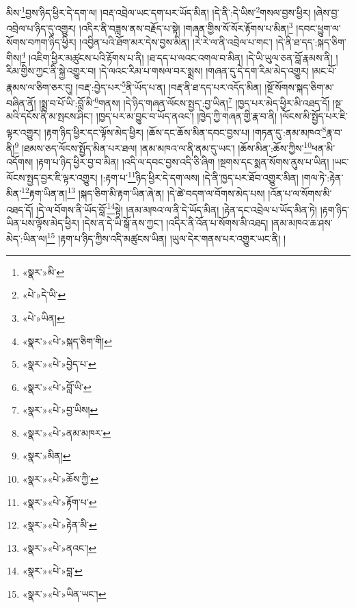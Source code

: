 མིས་\footnote{«སྣར་»མི་}བྱས་ཉིད་ཕྱིར་དེ་དག་ལ། །བརྡ་འབྲེལ་ཡང་དག་པར་ཡོད་མིན། །དེ་ནི་:དེ་ཡིས་\footnote{«པེ་»དེ་ཡི་}གསལ་བྱས་ཕྱིར། །ཞེས་བྱ་འབྲེལ་པ་ཉིད་དུ་འགྱུར། །འདིར་ནི་བཟླས་ནས་བརྗོད་པ་སྟེ། །གཞན་གྱིས་སོ་སོར་རྟོགས་པ་མིན།\footnote{«པེ་»ཡིན།} །དབང་ཕྱུག་ལ་སོགས་བཀག་ཉིད་ཕྱིར། །འབྱིན་པའི་ཐོག་མར་དེས་བྱས་མིན། །རེ་རེ་ལ་ནི་འབྲེལ་པ་གང་། །དེ་ནི་ཐ་དད་:སྐད་ཅིག་གིས།\footnote{«སྣར་»«པེ་»སྐད་ཅིག་གི།} །འཇིག་ཕྱིར་མཚུངས་པའི་རྟོགས་པ་ནི། །ཐ་དད་པ་ལའང་འགལ་བ་མིན། །དེ་ཡི་ཡུལ་ཅན་བློ་རྣམས་ནི། །རིམ་གྱིས་ཀྱང་ནི་སྐྱེ་འགྱུར་བ། །དེ་ལའང་རིམ་པ་གསལ་བར་སྨྲས། །གཞན་དུ་དེ་དག་རིམ་མེད་འགྱུར། །མང་པོ་རྣམས་ལ་ཅིག་ཅར་དུ། །བརྡ་:བྱེད་པར་\footnote{«སྣར་»«པེ་»བྱེད་པ་}ནི་ཡོད་པ་ན། །བརྡ་ནི་ཐ་དད་པར་འདོད་མིན། །སྔོ་སོགས་སྐད་ཅིག་མ་བཞིན་ནོ། །སྨྲ་བ་པོ་ཡི་:བློ་མི་\footnote{«སྣར་»«པེ་»བློ་ཡི་}གནས། །དེ་ཉིད་གཞན་ལོངས་སྤྱད་:བྱ་ཡིན།\footnote{«སྣར་»«པེ་»བྱ་ཡིས།} །ཁྱད་པར་མེད་ཕྱིར་མི་འཐད་དོ། །སྔ་མའི་དངོས་ནི་མ་སྤངས་ཤིང་། །ཁྱད་པར་མ་བྱུང་བ་ཡོད་ནའང་། །ཁྱེད་ཀྱི་གཞན་གྱི་རྣ་བ་ནི། །ལོངས་མི་སྤྱོད་པར་ཇི་ལྟར་འགྱུར། །རྟག་ཉིད་ཕྱིར་དང་ལྟོས་མེད་ཕྱིར། །ཆོས་དང་ཆོས་མིན་དབང་བྱས་པ། །གཏན་དུ་:ནམ་མཁའ་\footnote{«སྣར་»«པེ་»ནམ་མཁར་}རྣ་བ་ནི།\footnote{«སྣར་»མིན།} །ཐམས་ཅད་ལོངས་སྤྱོད་མིན་པར་ཐལ། །ནམ་མཁའ་ལ་ནི་ནམ་དུ་ཡང་། །ཆོས་མིན་:ཆོས་ཀྱིས་\footnote{«སྣར་»«པེ་»ཆོས་ཀྱི་}ཕན་མི་འདོགས། །རྟག་པ་ཉིད་ཕྱིར་བྱ་བ་མིན། །འདི་ལ་དབང་བྱས་འདི་ཅི་ཞིག །སྔགས་དང་སྨན་སོགས་ནུས་པ་ཡིན། །ཡང་ལོངས་སྤྱད་བྱར་ཇི་ལྟར་འགྱུར། །:རྟག་པ་\footnote{«སྣར་»«པེ་»རྟོག་པ་}ཉིད་ཕྱིར་དེ་དག་ལས། །དེ་ནི་ཁྱད་པར་ཐོབ་འགྱུར་མིན། །གལ་ཏེ་:རྟེན་མིན་\footnote{«སྣར་»«པེ་»རྟེན་མི་}རྟག་ཡིན་ན།\footnote{«སྣར་»«པེ་»ནའང་།} །སྐད་ཅིག་མི་རྟག་ཡིན་ཞེ་ན། །དེ་ཚེ་བདག་ལ་བོགས་མེད་པས། །འོན་པ་ལ་སོགས་མི་འཐད་དོ། །དེ་ལ་བོགས་ནི་ཡོད་བློ་\footnote{«སྣར་»«པེ་»བླ་}སྟེ། །ནམ་མཁའ་ལ་ནི་དེ་ཡོད་མིན། །རྟེན་དང་འབྲེལ་པ་ཡོད་མིན་ཏེ། །རྟག་ཉིད་ཡིན་པས་ལྟོས་མེད་ཕྱིར། །དེས་ན་དེ་ཡི་སྒོ་ནས་ཀྱང་། །འདིར་ནི་འོན་པ་སོགས་མི་འཐད། །ནམ་མཁའ་ཆ་ཤས་མེད་:ཡིན་ལ།\footnote{«སྣར་»«པེ་»ཡིན་ཡང་།} །རྟག་པ་ཉིད་ཀྱིས་འདི་མཚུངས་ཡིན། །ཡུལ་དེར་གནས་པར་འགྱུར་ཡང་ནི། །
